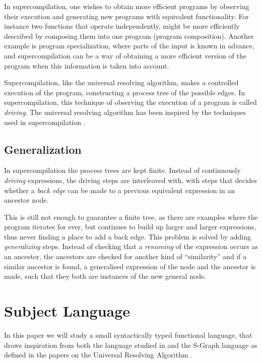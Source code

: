 \documentclass[10pt]{../sigplanconf}
\begin{document}
In supercompilation, one wishes to obtain more efficient programs by
observing their execution and generating new programs with equivalent
functionality. For instance two functions that operate independently,
might be more efficiently described by composing them into one program
(program composition). Another example is program specialization,
where parts of the input is known in advance, and supercompilation can
be a way of obtaining a more efficient version of the program when
this information is taken into account.

Supercompilation, like the universal resolving algorithm, makes a
controlled execution of the program, constructing a process tree of
the possible edges. In supercompilation, this technique of observing
the execution of a program is called \textit{driving}. The universal
resolving algorithm has been inspired by the techniques used in
supercompilation \cite{abramov2002principles}.

\subsection{Generalization}
In supercompilation the process trees are kept finite. Instead of
continuously \textit{driving} expressions, the driving steps are
interleaved with, with steps that decides whether a \textit{back edge}
can be made to a previous equivalent expression in an ancestor node.

This is still not enough to guarantee a finite tree, as there are
examples where the program iterates for ever, but continues to build
up larger and larger expressions, thus never finding a place to add a
back edge. This problem is solved by adding \textit{generalizing}
steps. Instead of checking that a \textit{renaming} of the expression
occurs as an ancestor, the ancestors are checked for another kind of
``similarity'' and if a similar ancestor is found, a generalised
expression of the node and the ancestor is made, such that they both
are instances of the new general node.

\section{Subject Language}
\label{sec:trfl}
In this paper we will study a small syntactically typed functional
language, that draws inspiration from both the language studied in
\cite{sorensen1998introduction} and the S-Graph language as defined in
the papers on the Universal Resolving Algorithm
\cite{abramov2000universal, abramov2002universal,
  abramov2002principles}.
\end{document}
